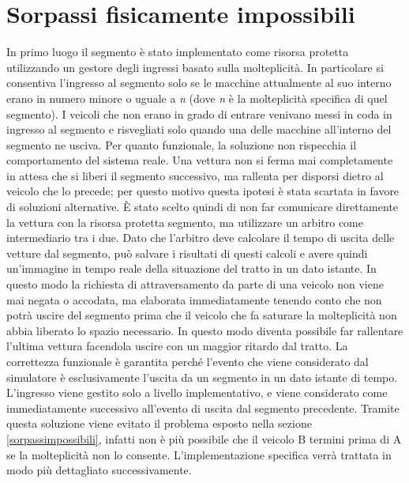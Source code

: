 \section{Sorpassi fisicamente impossibili}

In primo luogo il segmento è stato implementato come risorsa protetta utilizzando un gestore degli ingressi basato sulla molteplicità. In particolare si consentiva l'ingresso al segmento solo se le macchine attualmente al suo interno erano in numero minore o uguale a \emph{n} (dove \emph{n} è la molteplicità specifica di quel segmento). I veicoli che non erano in grado di entrare venivano messi in coda in ingresso al segmento e risvegliati solo quando una delle macchine all'interno del segmento ne usciva.
Per quanto funzionale, la soluzione non rispecchia il comportamento del sistema reale. Una vettura non si ferma mai completamente in attesa che si liberi il segmento successivo, ma rallenta per disporsi dietro al veicolo che lo precede; per questo motivo questa ipotesi è stata scartata in favore di soluzioni alternative.
È stato scelto quindi di non far comunicare direttamente la vettura con la risorsa protetta segmento, ma utilizzare un arbitro come intermediario tra i due. Dato che l'arbitro deve calcolare il tempo di uscita delle vetture dal segmento, può salvare i risultati di questi calcoli e avere quindi un'immagine in tempo reale della situazione del tratto in un dato istante. In questo modo la richiesta di attraversamento da parte di una veicolo non viene mai negata o accodata, ma elaborata immediatamente tenendo conto che non potrà uscire del segmento prima che il veicolo che fa saturare la molteplicità non abbia liberato lo spazio necessario. In questo modo diventa possibile far rallentare l'ultima vettura facendola uscire con un maggior ritardo dal tratto.
La correttezza funzionale è garantita perché l'evento che viene considerato dal simulatore è esclusivamente l'uscita da un segmento in un dato istante di tempo. L'ingresso viene gestito solo a livello implementativo, e viene considerato come immediatamente successivo all'evento di uscita dal segmento precedente.
Tramite questa soluzione viene evitato il problema esposto nella sezione \ref{sorpassimpossibili}, infatti non è più possibile che il veicolo B termini prima di A se la molteplicità non lo consente.
L'implementazione specifica verrà trattata in modo più dettagliato successivamente.